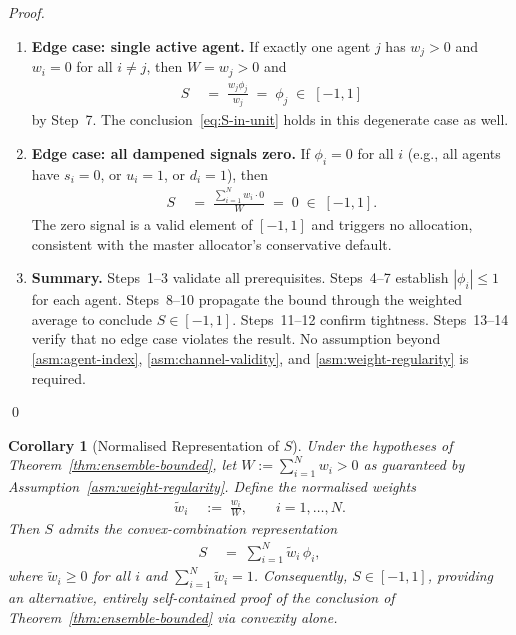 \documentclass[12pt,openany]{book}
\numberwithin{equation}{chapter}
\theoremstyle{plain}
\newtheorem{corollary}[theorem]{Corollary}
\theoremstyle{definition}
\theoremstyle{remark}
\numberwithin{equation}{chapter}
\theoremstyle{plain}
\begin{document}
\begin{proof}
\begin{enumerate}
  \item \textbf{Edge case: single active agent.}
        If exactly one agent $j$ has $w_j > 0$ and $w_i = 0$
        for all $i \neq j$, then $W = w_j > 0$ and
        \begin{align}
          S
          &\;=\;
          \frac{w_j \phi_j}{w_j}
          \;=\; \phi_j
          \;\in\; [-1,1]
        \end{align}
        by Step~7.  The conclusion~\eqref{eq:S-in-unit} holds
        in this degenerate case as well.

  \item \textbf{Edge case: all dampened signals zero.}
        If $\phi_i = 0$ for all $i$ (e.g., all agents have
        $s_i = 0$, or $u_i = 1$, or $d_i = 1$), then
        \begin{align}
          S
          &\;=\;
          \frac{\displaystyle\sum_{i=1}^{N} w_i \cdot 0}{W}
          \;=\; 0
          \;\in\; [-1,1].
        \end{align}
        The zero signal is a valid element of $[-1,1]$ and triggers
        no allocation, consistent with the master allocator's
        conservative default.

  \item \textbf{Summary.}
        Steps~1--3 validate all prerequisites.
        Steps~4--7 establish $|\phi_i| \leq 1$ for each agent.
        Steps~8--10 propagate the bound through the weighted average
        to conclude $S \in [-1,1]$.
        Steps~11--12 confirm tightness.
        Steps~13--14 verify that no edge case violates the result.
        No assumption beyond \ref{asm:agent-index},
        \ref{asm:channel-validity}, and \ref{asm:weight-regularity}
        is required.

\end{enumerate}
\qed
\end{proof}

\begin{corollary}[Normalised Representation of $S$]
\label{cor:S-normalised}
Under the hypotheses of Theorem~\ref{thm:ensemble-bounded},
let $W := \sum_{i=1}^{N} w_i > 0$ as guaranteed by
Assumption~\ref{asm:weight-regularity}.  Define the normalised
weights
\begin{align}
  \tilde{w}_i
  &\;:=\;
  \frac{w_i}{W},
  \qquad i = 1,\ldots,N.
  \label{eq:normalised-weights}
\end{align}
Then $S$ admits the convex-combination representation
\begin{align}
  S
  &\;=\;
  \sum_{i=1}^{N} \tilde{w}_i\,\phi_i,
  \label{eq:S-convex}
\end{align}
where $\tilde{w}_i \geq 0$ for all $i$ and
$\displaystyle\sum_{i=1}^{N} \tilde{w}_i = 1$.
Consequently, $S \in [-1,1]$, providing an alternative, entirely
self-contained proof of the conclusion of
Theorem~\ref{thm:ensemble-bounded} via convexity alone.
\end{corollary}
\end{document}
